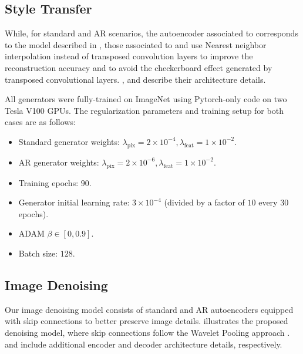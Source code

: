     
    
       
    \subsection{Style Transfer}
    \label{sec:supp_proposed_st}
    
    While, for standard and AR scenarios, the autoencoder associated to  corresponds to the model described in , those associated to  and  use Nearest neighbor interpolation instead of transposed convolution layers to improve the reconstruction accuracy and to avoid the checkerboard effect generated by transposed convolutional layers. , and  describe their architecture details.
    
    All generators were fully-trained on ImageNet using Pytorch-only code on two Tesla V100 GPUs. The regularization parameters and training setup for both cases are as follows:
    \begin{itemize}
     \setlength\itemsep{0.1\baselineskip}
        \item Standard generator weights: $\lambda_{\text{pix}}=2\times 10^{-4}, \lambda_{\text{feat}}=1\times 10^{-2}$.
        \item AR generator weights: $\lambda_{\text{pix}}=2\times 10^{-6}, \lambda_{\text{feat}}=1\times 10^{-2}$.
        \item Training epochs: $90$.
        \item Generator initial learning rate: $3\times 10^{-4}$ (divided by a factor of $10$ every $30$ epochs).
        \item ADAM $\beta\in [0, 0.9]$.
        \item Batch size: $128$.
    \end{itemize}
    
    
    
    
    \subsection{Image Denoising}
    \label{sec:supp_proposed_denoising}
   
    Our image denoising model consists of standard and AR autoencoders equipped with skip connections to better preserve image details.  illustrates the proposed denoising model, where skip connections follow the Wavelet Pooling approach \cite{yoo_2019_photorealistic}.  and  include additional encoder and decoder architecture details, respectively.
    
    
